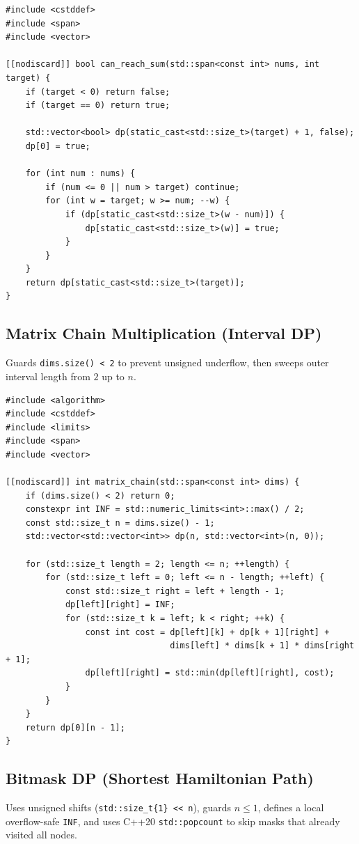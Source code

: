 \documentclass[11pt,a4paper]{article}
\theoremstyle{definition}
\begin{document}
\begin{lstlisting}[caption={Boolean Subset-Sum optimized to 1D backward loop}]
#include <cstddef>
#include <span>
#include <vector>

[[nodiscard]] bool can_reach_sum(std::span<const int> nums, int target) {
    if (target < 0) return false;
    if (target == 0) return true;

    std::vector<bool> dp(static_cast<std::size_t>(target) + 1, false);
    dp[0] = true;

    for (int num : nums) {
        if (num <= 0 || num > target) continue;
        for (int w = target; w >= num; --w) {
            if (dp[static_cast<std::size_t>(w - num)]) {
                dp[static_cast<std::size_t>(w)] = true;
            }
        }
    }
    return dp[static_cast<std::size_t>(target)];
}
\end{lstlisting}

\subsection{Matrix Chain Multiplication (Interval DP)}
Guards \texttt{dims.size() < 2} to prevent unsigned underflow, then sweeps outer interval length from $2$ up to $n$.

\begin{lstlisting}[caption={Matrix Chain Multiplication filled by interval length}]
#include <algorithm>
#include <cstddef>
#include <limits>
#include <span>
#include <vector>

[[nodiscard]] int matrix_chain(std::span<const int> dims) {
    if (dims.size() < 2) return 0;
    constexpr int INF = std::numeric_limits<int>::max() / 2;
    const std::size_t n = dims.size() - 1;
    std::vector<std::vector<int>> dp(n, std::vector<int>(n, 0));

    for (std::size_t length = 2; length <= n; ++length) {
        for (std::size_t left = 0; left <= n - length; ++left) {
            const std::size_t right = left + length - 1;
            dp[left][right] = INF;
            for (std::size_t k = left; k < right; ++k) {
                const int cost = dp[left][k] + dp[k + 1][right] +
                                 dims[left] * dims[k + 1] * dims[right + 1];
                dp[left][right] = std::min(dp[left][right], cost);
            }
        }
    }
    return dp[0][n - 1];
}
\end{lstlisting}

\subsection{Bitmask DP (Shortest Hamiltonian Path)}
Uses unsigned shifts (\texttt{std::size\_t\{1\} << n}), guards $n \le 1$, defines a local overflow-safe \texttt{INF}, and uses C++20 \texttt{std::popcount} to skip masks that already visited all nodes.
\end{document}
